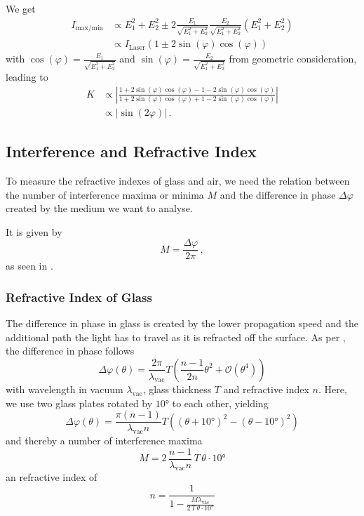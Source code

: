 We get
\begin{align*}
    I_{\text{max}/\text{min}} &\propto E^2_1 +E^2_2 \pm 2 \frac{E_1}{\sqrt{E^2_1 + E^2_2}} \frac{E_2}{\sqrt{E^2_1 + E^2_2}} (E^2_1+E^2_2) \\
    &\propto I_\text{Laser} (1 \pm 2 \sin(\varphi) \cos(\varphi))
\end{align*}
with $\cos(\varphi) = \frac{E_1}{\sqrt{E^2_1 + E^2_2}}$ and $\sin(\varphi) = \frac{E_2}{\sqrt{E^2_1 + E^2_2}}$ from geometric consideration,
leading to
\begin{align}
    K &\propto \left| \frac{1 + 2 \sin(\varphi) \cos(\varphi) - 1 - 2 \sin(\varphi) \cos(\varphi)}{1 + 2 \sin(\varphi) \cos(\varphi) + 1 - 2 \sin(\varphi) \cos(\varphi)}\right| \nonumber\\
      &\propto |\sin(2 \varphi)| \,.
      \label{eq:contrastprop}
\end{align}


\subsection{Interference and Refractive Index}
\label{subsec:intrefrac}

To measure the refractive indexes of glass and air, we need the relation between the number of interference maxima or minima $M$ and the difference in phase $\Delta\varphi$
created by the medium we want to analyse.

It is given by
\begin{equation}
    M = \frac{\Delta \varphi}{2 \pi}\,,
    \label{eq:intmax}
\end{equation} 
as seen in \cite{v64}.

\subsubsection{Refractive Index of Glass}

The difference in phase in glass is created by the lower propagation speed and the additional path the light has to travel as it is refracted off the surface.
As per \cite{v64}, the difference in phase follows
\begin{equation*}
    \Delta \varphi (\theta) = \frac{2 \pi}{\lambda_\text{vac}} T \left(\frac{n-1}{2n} \theta^2 + \mathcal{O}(\theta^4) \right)
\end{equation*}
with wavelength in vacuum $\lambda_\text{vac}$, glass thickness $T$ and refractive index $n$.
Here, we use two glass plates rotated by $10°$ to each other, yielding
\begin{equation*}
    \Delta \varphi(\theta) = \frac{\pi (n-1)}{\lambda_\text{vac} n}T \left((\theta + 10°)^2 - (\theta - 10°)^2\right)
\end{equation*}
and thereby a number of interference maxima
\begin{equation}
    M = 2 \, \frac{n-1}{\lambda_\text{vac} n} \, T \, \theta \cdot 10°
\end{equation}
an refractive index of
\begin{equation}
    n = \frac{1}{1 - \frac{M \lambda_\text{vac}}{2 \, T \, \theta \cdot 10°}}
    \label{eq:refractiveindexglass}
\end{equation}

